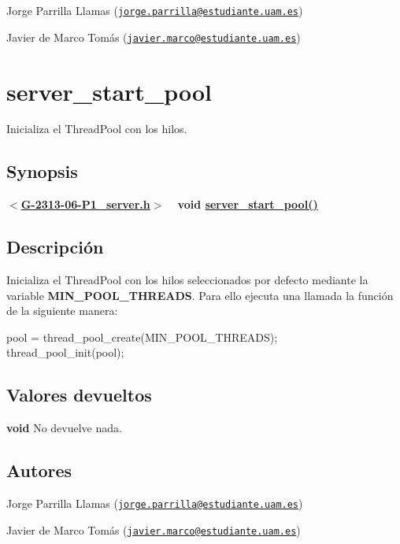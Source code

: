 \begin{DoxyItemize}
\item Jorge Parrilla Llamas (\href{mailto:jorge.parrilla@estudiante.uam.es}{\tt jorge.\+parrilla@estudiante.\+uam.\+es}) 
\item Javier de Marco Tomás (\href{mailto:javier.marco@estudiante.uam.es}{\tt javier.\+marco@estudiante.\+uam.\+es}) 
\end{DoxyItemize}\hypertarget{server_start_pool}{}\section{server\+\_\+start\+\_\+pool}\label{server_start_pool}
Inicializa el Thread\+Pool con los hilos.\hypertarget{server_start_pool_synopsis8}{}\subsection{Synopsis}\label{server_start_pool_synopsis8}
{ {\bfseries $<$\hyperlink{G-2313-06-P1__server_8h}{G-\/2313-\/06-\/\+P1\+\_\+server.\+h}$>$} ~\newline
 {\bfseries void \hyperlink{G-2313-06-P1__server_8c_a48d522cd984dc64ecd084f05416b1a94}{server\+\_\+start\+\_\+pool()}} } \hypertarget{server_start_pool_descripcion8}{}\subsection{Descripción}\label{server_start_pool_descripcion8}
Inicializa el Thread\+Pool con los hilos seleccionados por defecto mediante la variable {\bfseries M\+I\+N\+\_\+\+P\+O\+O\+L\+\_\+\+T\+H\+R\+E\+A\+D\+S}. Para ello ejecuta una llamada la función de la siguiente manera\+:

{\ttfamily  pool = thread\+\_\+pool\+\_\+create(\+M\+I\+N\+\_\+\+P\+O\+O\+L\+\_\+\+T\+H\+R\+E\+A\+D\+S); ~\newline
thread\+\_\+pool\+\_\+init(pool); } \hypertarget{server_start_pool_return8}{}\subsection{Valores devueltos}\label{server_start_pool_return8}

\begin{DoxyItemize}
\item {\bfseries void} No devuelve nada. 
\end{DoxyItemize}\hypertarget{server_start_pool_authors8}{}\subsection{Autores}\label{server_start_pool_authors8}

\begin{DoxyItemize}
\item Jorge Parrilla Llamas (\href{mailto:jorge.parrilla@estudiante.uam.es}{\tt jorge.\+parrilla@estudiante.\+uam.\+es}) 
\item Javier de Marco Tomás (\href{mailto:javier.marco@estudiante.uam.es}{\tt javier.\+marco@estudiante.\+uam.\+es}) 
\end{DoxyItemize}